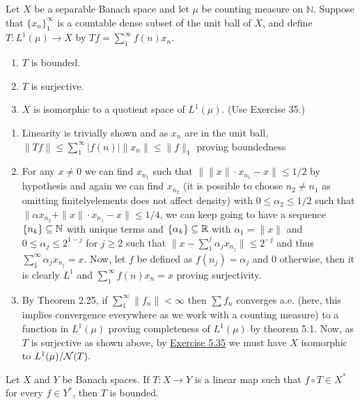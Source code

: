 \documentclass[12pt,a4paper]{article}
\begin{document}
\begin{problem}\label{prob:5-36}
Let $X$ be a separable Banach space and let $\mu$ be counting measure on $\mathbb{N}$. Suppose that $\{x_n\}_{1}^{\infty}$ is a countable dense subset of the unit ball of $X$, and define $T : L^1(\mu) \rightarrow X$ by $Tf = \sum_{1}^{\infty} f(n)x_n$.
\begin{enumerate}[label=\alph*.]
\item $T$ is bounded.
\item $T$ is surjective.
\item $X$ is isomorphic to a quotient space of $L^1(\mu)$. (Use Exercise 35.)
\end{enumerate}
\end{problem}
\begin{solution}
    \begin{enumerate}[label=\alph*.]
        \item Linearity is trivially shown and as $x_n$ are in the unit ball, $\|Tf\|\leq\sum_1^\infty|f(n)|\|x_n\|\leq\|f\|_1$ proving boundedness
        \item For any $x\neq 0$ we can find $x_{n_1}$ such that $\|\|x\|\cdot x_{n_1}-x\|\leq 1/2$ by hypothesis and again we can find $x_{n_2}$ (it is possible to choose $n_2\neq n_1$ as omitting finitelyelements does not affect density) with $0\leq\alpha_2\leq 1/2$ such that $\|\alpha x_{n_2}+\|x\|\cdot x_{n_1}-x\|\leq 1/4$, we can keep going to have a sequence $\{n_k\} \subseteq\mathbb{N}$ with unique terms and $\{\alpha_k\} \subseteq\mathbb{R}$ with $\alpha_1=\|x\|$ and $0\leq\alpha_j\leq 2^{1-j}$ for $j\geq 2$ such that $\|x-\sum_1^j\alpha_j x_{n_j}\|\leq 2^{-j}$ and thus $\sum_1^\infty\alpha_jx_{n_j}=x.$ 
            Now, let $f$ be defined as $f(n_j)=\alpha_j$ and $0$ otherwise, then it is clearly $L^1$ and $\sum_1^\infty f(n)x_n=x$ proving surjectivity. 
        \item By Theorem 2.25, if $\sum_1^\infty\|f_n\|<\infty$ then $\sum f_n$ converges a.e. (here, this implies convergence everywhere as we work with a counting measure) to a function in $L^1(\mu)$ proving completeness of $L^1(\mu)$ by theorem 5.1. 
            Now, as $T$ is surjective as shown above, by \hyperref[prob:5-35]{Exercise 5.35} we must have $X$ isomorphic to $L^1(\mu)/\mathcal{N}(T).$ 
    \end{enumerate}
\end{solution}
\begin{problem}\label{prob:5-37}
Let $X$ and $Y$ be Banach spaces. If $T : X \rightarrow Y$ is a linear map such that $f \circ T \in X^*$ for every $f \in Y^*$, then $T$ is bounded.
\end{problem}
\end{document}

